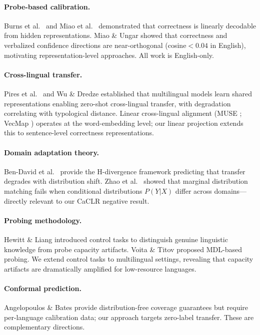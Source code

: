 \documentclass[11pt,a4paper]{article}
\begin{document}
\paragraph{Probe-based calibration.}
Burns et al.\ \citeyear{burns2023discovering} and Miao et al.\ \citeyear{miao2026coral} demonstrated that correctness is linearly decodable from hidden representations.
Miao \& Ungar \citeyear{miao2026orthogonality} showed that correctness and verbalized confidence directions are near-orthogonal (cosine${<}0.04$ in English), motivating representation-level approaches.
All work is English-only.

\paragraph{Cross-lingual transfer.}
Pires et al.\ \citeyear{pires2019multilingual} and Wu \& Dredze \citeyear{wu2019beto} established that multilingual models learn shared representations enabling zero-shot cross-lingual transfer, with degradation correlating with typological distance.
Linear cross-lingual alignment (MUSE \cite{conneau2018word}; VecMap \cite{artetxe2018robust}) operates at the word-embedding level; our linear projection extends this to sentence-level correctness representations.

\paragraph{Domain adaptation theory.}
Ben-David et al.\ \citeyear{bendavid2010theory} provide the H-divergence framework predicting that transfer degrades with distribution shift.
Zhao et al.\ \citeyear{zhao2019learning} showed that marginal distribution matching fails when conditional distributions $P(Y|X)$ differ across domains---directly relevant to our CaCLR negative result.

\paragraph{Probing methodology.}
Hewitt \& Liang \citeyear{hewitt2019designing} introduced control tasks to distinguish genuine linguistic knowledge from probe capacity artifacts.
Voita \& Titov \citeyear{voita2020information} proposed MDL-based probing.
We extend control tasks to multilingual settings, revealing that capacity artifacts are dramatically amplified for low-resource languages.

\paragraph{Conformal prediction.}
Angelopoulos \& Bates \citeyear{angelopoulos2023conformal} provide distribution-free coverage guarantees but require per-language calibration data; our approach targets zero-label transfer.
These are complementary directions.
\end{document}
